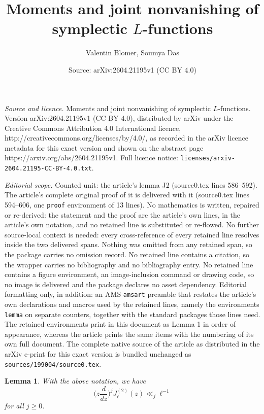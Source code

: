 \documentclass[10pt,a4paper]{amsart}
\title{Moments and joint nonvanishing of symplectic $L$-functions}
\author{Valentin Blomer, Soumya Das}
\date{Source: arXiv:2604.21195v1 (CC BY 4.0)}
\newtheorem{lemma}{Lemma}
\renewcommand{\geq}{\geqslant}
\begin{document}
\maketitle

\noindent\emph{Source and licence.} Moments and joint nonvanishing of symplectic $L$-functions. Version arXiv:2604.21195v1 (CC BY 4.0), distributed by arXiv under the Creative Commons Attribution 4.0 International licence, http://creativecommons.org/licenses/by/4.0/, as recorded in the arXiv licence metadata for this exact version and shown on the abstract page https://arxiv.org/abs/2604.21195v1. Full licence notice: \texttt{licenses/arxiv-2604.21195-CC-BY-4.0.txt}.\par\smallskip

\noindent\textit{Editorial scope.} Counted unit: the article's lemma J2 (source0.tex lines 586--592). The article's complete original proof of it is delivered with it (source0.tex lines 594--606, one \texttt{proof} environment of 13 lines). No mathematics is written, repaired or re-derived: the statement and the proof are the article's own lines, in the article's own notation, and no retained line is substituted or re-flowed.  No further source-local context is needed: every cross-reference of every retained line resolves inside the two delivered spans.  Nothing was omitted from any retained span, so the package carries no omission record.  No retained line contains a citation, so the wrapper carries no bibliography and no bibliography entry.  No retained line contains a figure environment, an image-inclusion command or drawing code, so no image is delivered and the package declares no asset dependency.  Editorial formatting only, in addition: an AMS \texttt{amsart} preamble that restates the article's own declarations and macros used by the retained lines, namely the environments \texttt{lemma} on separate counters, together with the standard packages those lines need.  The retained environments print in this document as Lemma 1 in order of appearance, whereas the article prints the same items with the numbering of its own full document.  The complete native source of the article as distributed in the arXiv e-print for this exact version is bundled unchanged as \texttt{sources/199004/source0.tex}.
\begin{lemma}
With the above notation, we have
\begin{equation}\label{J2} 
   \Big(z \frac{d}{dz}\Big)^j J_{\ell}^{(2)}(z) \ll_j \ell^{-1}
\end{equation}
for all $j \geq 0$. 
\end{lemma}
\end{document}
